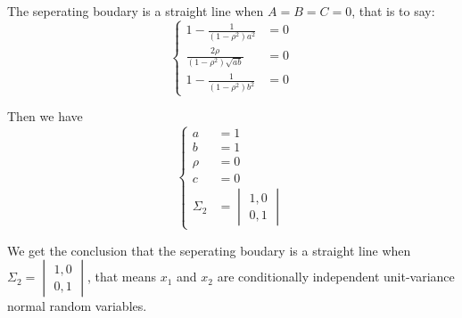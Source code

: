 \documentclass{article}
\newenvironment{answer}{\par\color{ForestGreen}}{\par}
\begin{document}
\begin{answer}
      The seperating boudary is a straight line when $A = B = C = 0$, that is to say:
            $$\begin{cases} 1 - \frac{1}{(1-\rho^2)a^2}  & = 0\\
                           \frac{2\rho}{(1-\rho^2)\sqrt{ab}} & = 0 \\
                           1 - \frac{1}{(1-\rho^2)b^2}  &= 0
       \end{cases}$$

       Then we have $$\begin{cases} a & = 1  \\
                                    b & = 1 \\
                                 \rho & = 0 \\
                                    c & = 0 \\
                             \Sigma_2 & = \begin{vmatrix} 1, 0 \\ 0, 1\end{vmatrix}
  \end{cases}$$

  We get the conclusion that the seperating boudary is a straight line when $\Sigma_2 = \begin{vmatrix} 1, 0 \\ 0, 1\end{vmatrix}$, that means $x_1$ and $x_2$ are conditionally independent unit-variance normal random variables.
\end{answer}
\end{document}
